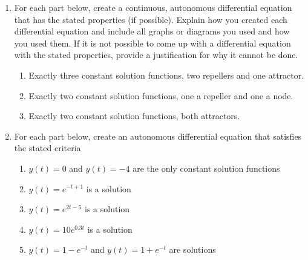 \begin{enumerate}

\item For each part below, create a continuous, autonomous differential equation that has the stated properties (if possible). Explain how you created each differential equation and include all graphs or diagrams you used and how you used them. If it is not possible to come up with a differential equation with the stated properties, provide a justification for why it cannot be done. \label{06HWproblem3}

\begin{enumerate}
\item Exactly three constant solution functions, two repellers and one attractor.
\item	Exactly two constant solution functions, one a repeller and one a node.
\item	Exactly two constant solution functions, both attractors.
\end{enumerate}

\item For each part below, create an autonomous differential equation that satisfies the stated criteria \label{06HWproblem4}
\begin{enumerate}
\item	$y(t)=0$ and $y(t) = -4$ are the only constant solution functions
\item $y(t)=e^{-t+1}$ is a solution
\item $y(t)=e^{2t-5}$	is a solution
\item $y(t)=10e^{0.3t}$ is a solution
\item $y(t)=1-e^{-t}$ and $y(t)=1+e^{-t}$ are solutions
\end{enumerate}


\end{enumerate}
